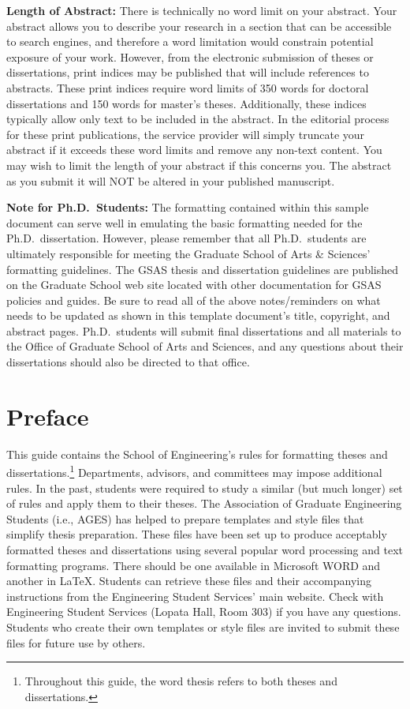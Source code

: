 \begin{thesisabstract}
\textbf{Length of Abstract:}
There is technically no word limit on your abstract.  Your abstract allows you
to describe your research in a section that can be accessible to search
engines, and therefore a word limitation would constrain potential exposure of
your work. However, from the electronic submission of theses or dissertations,
print indices may be published that will include references to abstracts. These
print indices require word limits of 350 words for doctoral dissertations and
150 words for master's theses. Additionally, these indices typically allow only
text to be included in the abstract. In the editorial process for these print
publications, the service provider will simply truncate your abstract if it
exceeds these word limits and remove any non-text content. You may wish to
limit the length of your abstract if this concerns you. The abstract as you
submit it will NOT be altered in your published manuscript.

\textbf{Note for Ph.D.\ Students:}
The formatting contained within this sample document can serve well in
emulating the basic formatting needed for the Ph.D.\ dissertation.   However,
please remember that all Ph.D.\ students are ultimately responsible for meeting
the Graduate School of Arts \& Sciences' formatting guidelines.  The GSAS
thesis and dissertation guidelines are published on the Graduate School web
site located with other documentation for GSAS policies and guides.  Be sure to
read all of the above notes/reminders on what needs to be updated as shown in
this template document's title, copyright, and abstract pages.  Ph.D.\ students
will submit final dissertations and all materials to the Office of Graduate
School of Arts and Sciences, and any questions about their dissertations should
also be directed to that office.
\fi
\end{thesisabstract}



\iffalse
\chapter{Preface}

This guide contains the School of Engineering's rules for formatting theses and
dissertations.\footnote{Throughout this guide, the word thesis refers to both
theses and dissertations.}   Departments, advisors, and committees may impose
additional rules.  In the past, students were required to study a similar (but
much longer) set of rules and apply them to their theses.  The Association of
Graduate Engineering Students (i.e., AGES) has helped to prepare templates and
style files that simplify thesis preparation.  These files have been set up to
produce acceptably formatted theses and dissertations using several popular
word processing and text formatting programs.  There should be one available in
Microsoft WORD and another in \LaTeX{}.  Students can retrieve these files and
their accompanying instructions from the Engineering Student Services' main
website.  Check with Engineering Student Services (Lopata Hall, Room 303) if
you have any questions.  Students who create their own templates or style files
are invited to submit these files for future use by others.

